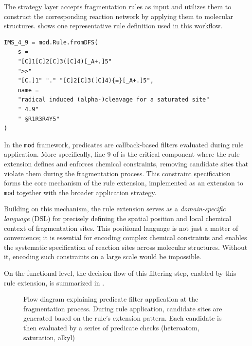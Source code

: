 The strategy layer accepts fragmentation rules as input and utilizes them to construct the corresponding reaction network by applying them to molecular structures.
 shows one representative rule definition used in this workflow.


\begin{listing}[ht]
    \centering
    \begin{verbatim}
IMS_4_9 = mod.Rule.fromDFS(
    s =
    "[C]1[C]2[C]3([C]4)[_A+.]5"
    ">>"
    "[C.]1" "." "[C]2[C]3([C]4){=}[_A+.]5",
    name =
    "radical induced (alpha-)cleavage for a saturated site"
    " 4.9"
    " §R1R3R4Y5"
)
    \end{verbatim}
    \caption{Sample Fragmentation Rule \cite[p.~59]{McLafferty1993}}
    \label{lst:sampelRule}
\end{listing}

In the \texttt{mod} framework, predicates are callback-based filters evaluated during rule application.
More specifically, line 9 of  is the critical component where the rule extension defines and enforces chemical constraints, removing candidate sites that violate them during the fragmentation process.
This constraint specification forms the core mechanism of the rule extension, implemented as an extension to \texttt{mod} together with the broader application strategy.

Building on this mechanism, the rule extension serves as a \emph{domain-specific language} (DSL) for precisely defining the spatial position and local chemical context of fragmentation sites.
This positional language is not just a matter of convenience; it is essential for encoding complex chemical constraints and enables the systematic specification of reaction sites across molecular structures.
Without it, encoding such constraints on a large scale would be impossible.

On the functional level, the decision flow of this filtering step, enabled by this rule extension, is summarized in .

\begin{figure}
    \centering
    
    \caption[Flow diagram of predicate filter application]{
        Flow diagram explaining predicate filter application at the fragmentation process.
        During rule application, candidate sites are generated based on the rule's extension pattern.
        Each candidate is then evaluated by a series of predicate checks (heteroatom, saturation, alkyl)
    }
    \label{fig:predicate-filter}
\end{figure}

